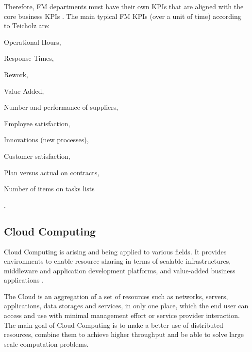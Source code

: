 Therefore, FM departments must have their own KPIs that are aligned with the core business KPIs \cite{Teicholz2001}. The main typical FM KPIs (over a unit of time) according to Teicholz \cite{Teicholz2001} are: 
\begin{enumerate*}[label=\itshape\roman{enumi})]
	\item Operational Hours,
	\item Response Times,
	\item Rework,
	\item Value Added,
	\item Number and performance of suppliers,
	\item Employee satisfaction,
	\item Innovations (new processes),
	\item Customer satisfaction,
	\item Plan versus actual on contracts,
	\item Number of items on tasks lists
\end{enumerate*}.

\subsection{Cloud Computing}

Cloud Computing is arising and being applied to various fields. It provides environments to enable resource sharing in terms of scalable infrastructures, middleware and application development platforms, and value-added business applications \cite{Zhang2009}.



The Cloud is an aggregation of a set of resources such as networks, servers, applications, data storages and services, in only one place, which the end user can access and use with minimal management effort or service provider interaction. 
The main goal of Cloud Computing is to make a better use of distributed resources, combine them to achieve higher throughput and be able to solve large scale computation problems.


